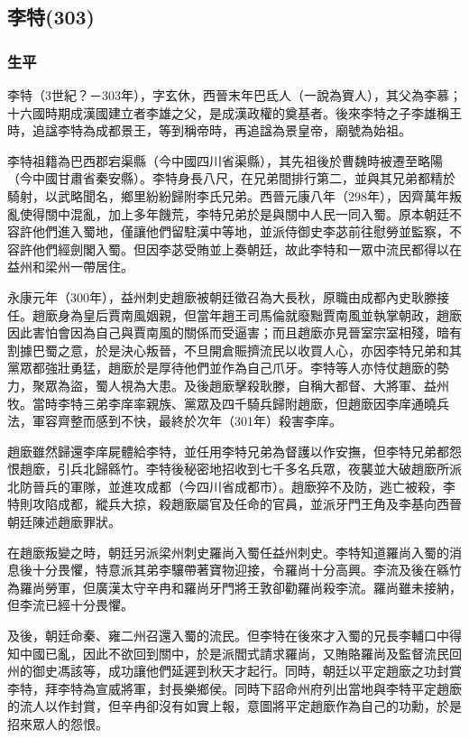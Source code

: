 
\subsection{李特\tiny(303)}

\subsubsection{生平}

李特（3世紀？－303年），字玄休，西晉末年巴氐人（一說為賨人），其父為李慕；十六國時期成漢國建立者李雄之父，是成漢政權的奠基者。後來李特之子李雄稱王時，追諡李特為成都景王，等到稱帝時，再追諡為景皇帝，廟號為始祖。

李特祖籍為巴西郡宕渠縣（今中國四川省渠縣），其先祖後於曹魏時被遷至略陽（今中國甘肅省秦安縣）。李特身長八尺，在兄弟間排行第二，並與其兄弟都精於騎射，以武略聞名，鄉里紛紛歸附李氏兄弟。西晉元康八年（298年），因齊萬年叛亂使得關中混亂，加上多年饑荒，李特兄弟於是與關中人民一同入蜀。原本朝廷不容許他們進入蜀地，僅讓他們留駐漢中等地，並派侍御史李苾前往慰勞並監察，不容許他們經劍閣入蜀。但因李苾受賄並上奏朝廷，故此李特和一眾中流民都得以在益州和梁州一帶居住。

永康元年（300年），益州刺史趙廞被朝廷徵召為大長秋，原職由成都內史耿滕接任。趙廞身為皇后賈南風姻親，但當年趙王司馬倫就廢黜賈南風並執掌朝政，趙廞因此害怕會因為自己與賈南風的關係而受逼害；而且趙廞亦見晉室宗室相殘，暗有割據巴蜀之意，於是決心叛晉，不旦開倉賑擠流民以收買人心，亦因李特兄弟和其黨眾都強壯勇猛，趙廞於是厚待他們並作為自己爪牙。李特等人亦恃仗趙廞的勢力，聚眾為盜，蜀人視為大患。及後趙廞擊殺耿滕，自稱大都督、大將軍、益州牧。當時李特三弟李庠率親族、黨眾及四千騎兵歸附趙廞，但趙廞因李庠通曉兵法，軍容齊整而感到不快，最終於次年（301年）殺害李庠。

趙廞雖然歸還李庠屍體給李特，並任用李特兄弟為督護以作安撫，但李特兄弟都怨恨趙廞，引兵北歸緜竹。李特後秘密地招收到七千多名兵眾，夜襲並大破趙廞所派北防晉兵的軍隊，並進攻成都（今四川省成都市）。趙廞猝不及防，逃亡被殺，李特則攻陷成都，縱兵大掠，殺趙廞屬官及任命的官員，並派牙門王角及李基向西晉朝廷陳述趙廞罪狀。

在趙廞叛變之時，朝廷另派梁州刺史羅尚入蜀任益州刺史。李特知道羅尚入蜀的消息後十分畏懼，特意派其弟李驤帶著寶物迎接，令羅尚十分高興。李流及後在緜竹為羅尚勞軍，但廣漢太守辛冉和羅尚牙門將王敦卻勸羅尚殺李流。羅尚雖未接納，但李流已經十分畏懼。

及後，朝廷命秦、雍二州召還入蜀的流民。但李特在後來才入蜀的兄長李輔口中得知中國已亂，因此不欲回到關中，於是派閻式請求羅尚，又賄賂羅尚及監督流民回州的御史馮該等，成功讓他們延遲到秋天才起行。同時，朝廷以平定趙廞之功封賞李特，拜李特為宣威將軍，封長樂鄉侯。同時下詔命州府列出當地與李特平定趙廞的流人以作封賞，但辛冉卻沒有如實上報，意圖將平定趙廞作為自己的功勳，於是招來眾人的怨恨。

